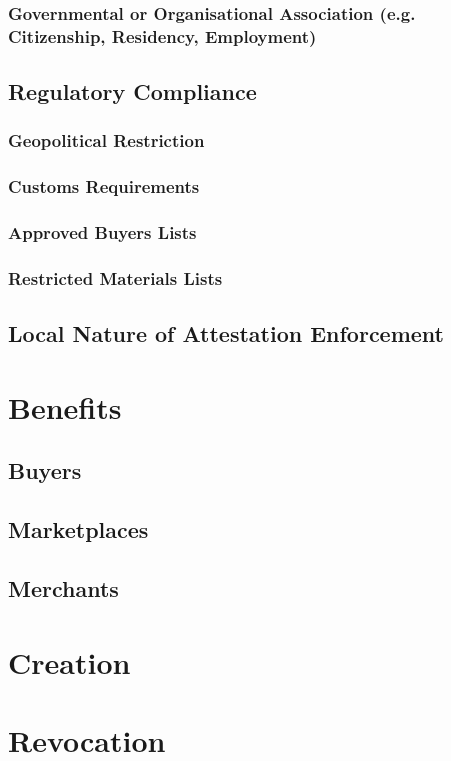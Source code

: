 \subsubsection{Governmental or Organisational Association (e.g. Citizenship, Residency, Employment)}


\subsection{Regulatory Compliance}

\subsubsection{Geopolitical Restriction}

\subsubsection{Customs Requirements}

\subsubsection{Approved Buyers Lists}

\subsubsection{Restricted Materials Lists}

\subsection{Local Nature of Attestation Enforcement}

\section{Benefits}

\subsection{Buyers}

\subsection{Marketplaces}

\subsection{Merchants}

\section{Creation}

\section{Revocation}
